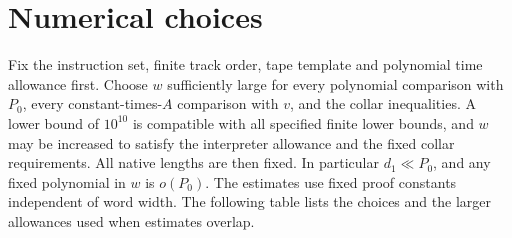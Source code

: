 \section{Numerical choices}\label{sec:constants}

Fix the instruction set, finite track order, tape template and polynomial time allowance first. Choose \(w\) sufficiently large for every polynomial comparison with \(P_0\), every constant-times-\(A\) comparison with \(v\), and the collar inequalities. A lower bound of \(10^{10}\) is compatible with all specified finite lower bounds, and \(w\) may be increased to satisfy the interpreter allowance and the fixed collar requirements. All native lengths are then fixed. In particular \(d_1\ll P_0\), and any fixed polynomial in \(w\) is \(o(P_0)\). The estimates use fixed proof constants independent of word width. The following table lists the choices and the larger allowances used when estimates overlap.

